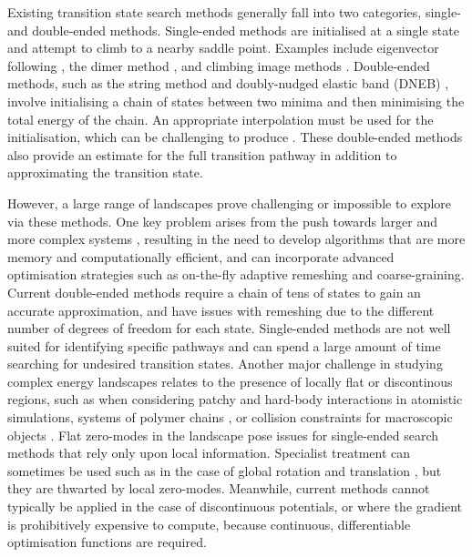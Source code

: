 \documentclass[twocolumn,10pt]{revtex4-2}
\begin{document}
Existing transition state search methods generally fall into two categories, single- and double-ended methods.
Single-ended methods are initialised at a single state and attempt to climb to a nearby saddle point.
Examples include eigenvector following \cite{Cerjan1981}, the dimer method \cite{Heyden2005,Kastner2008,Zhang2016}, and climbing image methods \cite{E2007,Ren2013}.
Double-ended methods, such as the string method \cite{E2002,E2007} and doubly-nudged elastic band (DNEB) \cite{Trygubenko2004}, involve initialising a chain of states between two minima and then minimising the total energy of the chain.
An appropriate interpolation must be used for the initialisation, which can be challenging to produce \cite{Wales2012a}.
These double-ended methods also provide an estimate for the full transition pathway in addition to approximating the transition state.

However, a large range of landscapes prove challenging or impossible to explore via these methods.
One key problem arises from the push towards larger and more complex systems \cite{Trefethen2013,Shalf2020,Alexander2020}, resulting in the need to develop algorithms that are more memory and computationally efficient, and can incorporate advanced optimisation strategies such as on-the-fly adaptive remeshing and coarse-graining.
Current double-ended methods require a chain of tens of states to gain an accurate approximation, and have issues with remeshing due to the different number of degrees of freedom for each state.
Single-ended methods are not well suited for identifying specific pathways and can spend a large amount of time searching for undesired transition states.
Another major challenge in studying complex energy landscapes relates to the presence of locally flat or discontinous regions, such as when considering patchy \cite{McMullen2018,Nguemaha2018,Chen2018b} and hard-body \cite{Richard2018,Santra2018} interactions in atomistic simulations, systems of polymer chains \cite{Mokkonen2016}, or collision constraints for macroscopic objects \cite{Wriggers2006}.
Flat zero-modes in the landscape pose issues for single-ended search methods that rely only upon local information.
Specialist treatment can sometimes be used such as in the case of global rotation and translation \cite{Page1988}, but they are thwarted by local zero-modes.
Meanwhile, current methods cannot typically be applied in the case of discontinuous potentials, or where the gradient is prohibitively expensive to compute, because continuous, differentiable optimisation functions are required.
\end{document}
